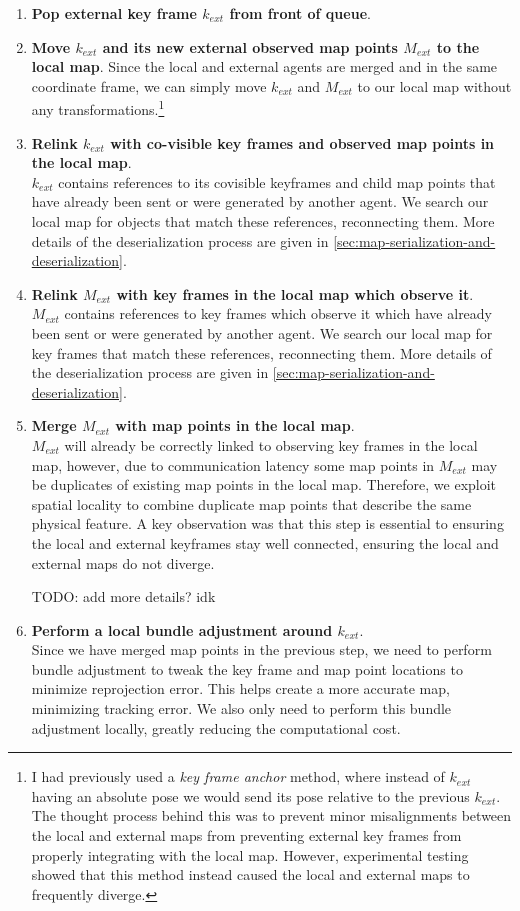 \begin{enumerate}
    \item \textbf{Pop external key frame $k_{ext}$ from front of queue}.
    \item \textbf{Move $k_{ext}$ and its new external observed map points $M_{ext}$ to the local map}.
          Since the local and external agents are merged and in the same coordinate frame, we can simply move $k_{ext}$ and $M_{ext}$ to our local map without any transformations.\footnote[1]{I had previously used a \textit{key frame anchor} method, where instead of $k_{ext}$ having an absolute pose we would send its pose relative to the previous $k_{ext}$. The thought process behind this was to prevent minor misalignments between the local and external maps from preventing external key frames from properly integrating with the local map. However, experimental testing showed that this method instead caused the local and external maps to frequently diverge.}
    \item \textbf{Relink $k_{ext}$ with co-visible key frames and observed map points in the local map}. \\
          $k_{ext}$ contains references to its covisible keyframes and child map points that have already been sent or were generated by another agent. We search our local map for objects that match these references, reconnecting them. More details of the deserialization process are given in \autoref{sec:map-serialization-and-deserialization}.
    \item \textbf{Relink $M_{ext}$ with key frames in the local map which observe it}. \\
          $M_{ext}$ contains references to key frames which observe it which have already been sent or were generated by another agent. We search our local map for key frames that match these references, reconnecting them. More details of the deserialization process are given in \autoref{sec:map-serialization-and-deserialization}.
    \item \textbf{Merge $M_{ext}$ with map points in the local map}. \\
          $M_{ext}$ will already be correctly linked to observing key frames in the local map, however, due to communication latency some map points in $M_{ext}$ may be duplicates of existing map points in the local map. Therefore, we exploit spatial locality to combine duplicate map points that describe the same physical feature. A key observation was that this step is essential to ensuring the local and external keyframes stay well connected, ensuring the local and external maps do not diverge.

          TODO: add more details? idk
    \item \textbf{Perform a local bundle adjustment around $k_{ext}$}. \\
          Since we have merged map points in the previous step, we need to perform bundle adjustment to tweak the key frame and map point locations to minimize reprojection error. This helps create a more accurate map, minimizing tracking error. We also only need to perform this bundle adjustment locally, greatly reducing the computational cost.
\end{enumerate}



